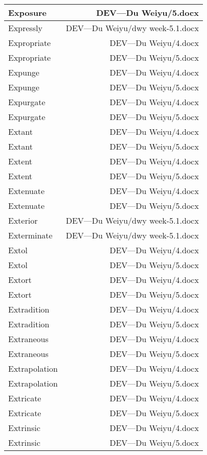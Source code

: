 \documentclass{article}
\begin{document}
\begin{center}
\begin{longtable}{|l|r|}
\hline
Exposure  &  DEV---Du Weiyu/5.docx\\  
\hline
Expressly  &  DEV---Du Weiyu/dwy week-5.1.docx\\  
\hline
Expropriate  &  DEV---Du Weiyu/4.docx\\  
\hline
Expropriate  &  DEV---Du Weiyu/5.docx\\  
\hline
Expunge  &  DEV---Du Weiyu/4.docx\\  
\hline
Expunge  &  DEV---Du Weiyu/5.docx\\  
\hline
Expurgate  &  DEV---Du Weiyu/4.docx\\  
\hline
Expurgate  &  DEV---Du Weiyu/5.docx\\  
\hline
Extant  &  DEV---Du Weiyu/4.docx\\  
\hline
Extant  &  DEV---Du Weiyu/5.docx\\  
\hline
Extent  &  DEV---Du Weiyu/4.docx\\  
\hline
Extent  &  DEV---Du Weiyu/5.docx\\  
\hline
Extenuate  &  DEV---Du Weiyu/4.docx\\  
\hline
Extenuate  &  DEV---Du Weiyu/5.docx\\  
\hline
Exterior  &  DEV---Du Weiyu/dwy week-5.1.docx\\  
\hline
Exterminate  &  DEV---Du Weiyu/dwy week-5.1.docx\\  
\hline
Extol  &  DEV---Du Weiyu/4.docx\\  
\hline
Extol  &  DEV---Du Weiyu/5.docx\\  
\hline
Extort  &  DEV---Du Weiyu/4.docx\\  
\hline
Extort  &  DEV---Du Weiyu/5.docx\\  
\hline
Extradition  &  DEV---Du Weiyu/4.docx\\  
\hline
Extradition  &  DEV---Du Weiyu/5.docx\\  
\hline
Extraneous  &  DEV---Du Weiyu/4.docx\\  
\hline
Extraneous  &  DEV---Du Weiyu/5.docx\\  
\hline
Extrapolation  &  DEV---Du Weiyu/4.docx\\  
\hline
Extrapolation  &  DEV---Du Weiyu/5.docx\\  
\hline
Extricate  &  DEV---Du Weiyu/4.docx\\  
\hline
Extricate  &  DEV---Du Weiyu/5.docx\\  
\hline
Extrinsic  &  DEV---Du Weiyu/4.docx\\  
\hline
Extrinsic  &  DEV---Du Weiyu/5.docx\\  

\end{longtable}
\end{center}
\end{document}

